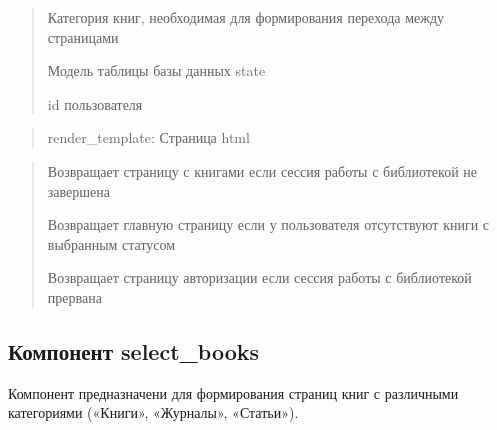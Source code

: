 \documentclass[letterpaper,10pt,russian]{sphinxmanual}
\begin{document}
\begin{fulllineitems}
\begin{description}
\begin{quote}
\begin{description}
\sphinxAtStartPar
Категория книг, необходимая для формирования перехода между страницами

\sphinxAtStartPar
Модель таблицы базы данных state

\sphinxAtStartPar
id пользователя

\end{description}\end{quote}

\end{description}
\begin{quote}\begin{description}
\sphinxAtStartPar
render\_template: Страница html

\end{description}\end{quote}
\begin{description}
\begin{quote}\begin{description}
\sphinxAtStartPar
Возвращает страницу с книгами если сессия работы с библиотекой  не завершена

\sphinxAtStartPar
Возвращает главную страницу если у пользователя отсутствуют книги с выбранным статусом

\sphinxAtStartPar
Возвращает страницу авторизации если сессия работы с библиотекой прервана

\end{description}\end{quote}

\end{description}

\end{fulllineitems}



\subsection{Компонент select\_books}
\label{\detokenize{blueprints:select-books}}
\begin{DUlineblock}{0em}
\item[] Компонент предназначени для формирования страниц книг с различными категориями («Книги», «Журналы», «Статьи»).
\end{DUlineblock}
\label{\detokenize{blueprints:module-blueprints.select_books}}
\end{document}
